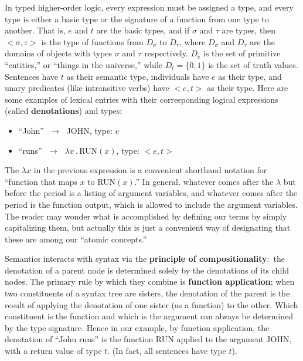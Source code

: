 \documentclass[11pt, oneside]{article}      %
\begin{document}
In typed higher-order logic, every expression must be assigned a type, and every type is either a basic type or the signature of a function from one type to another.  That is, $e$ and $t$ are the basic types, and if $\sigma$ and $\tau$ are types, then ${<}\sigma, \tau{>}$ is the type of functions from $D_{\sigma}$ to $D_{\tau}$, where $D_{\sigma}$ and $D_{\tau}$ are the domains of objects with types $\sigma$ and $\tau$ respectively.  $D_e$ is the set of primitive ``entities,'' or ``things in the universe,'' while $D_t = \{0, 1\}$ is the set of truth values.  Sentences have $t$ as their semantic type, individuals have $e$ as their type, and unary predicates (like intransitive verbs) have ${<}e, t{>}$ as their type.  Here are some examples of lexical entries with their corresponding logical expressions (called \textbf{denotations}) and types:

\begin{itemize}
\item ``John'' $\; \rightarrow \;$ JOHN, \quad \quad \quad type: $e$
\item ``runs'' $\; \rightarrow \;$ $\lambda x \, . \, $RUN$(x)$, \; type: ${<}e, t{>}$
\end{itemize}

The $\lambda x$ in the previous expression is a convenient shorthand notation for ``function that maps $x$ to RUN$(x)$.'' In general, whatever comes after the $\lambda$ but before the period is a listing of argument variables, and whatever comes after the period is the function output, which is allowed to include the argument variables.  The reader may wonder what is accomplished by defining our terms by simply capitalizing them, but actually this is just a convenient way of designating that these are among our ``atomic concepts.'' 

Semantics interacts with syntax via the \textbf{principle of compositionality}:\ the denotation of a parent node is determined solely by the denotations of its child nodes.  The primary rule by which they combine is \textbf{function application}; when two constituents of a syntax tree are sisters, the denotation of the parent is the result of applying the denotation of one sister (as a function) to the other.  Which constituent is the function and which is the argument can always be determined by the type signature. Hence in our example, by function application, the denotation of ``John runs'' is the function RUN applied to the argument JOHN, with a return value of type $t$.  (In fact, all sentences have type $t$).
\end{document}
